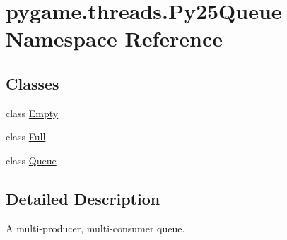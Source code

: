 \hypertarget{namespacepygame_1_1threads_1_1_py25_queue}{}\section{pygame.\+threads.\+Py25\+Queue Namespace Reference}
\label{namespacepygame_1_1threads_1_1_py25_queue}
\subsection*{Classes}
\begin{DoxyCompactItemize}
\item 
class \hyperlink{classpygame_1_1threads_1_1_py25_queue_1_1_empty}{Empty}
\item 
class \hyperlink{classpygame_1_1threads_1_1_py25_queue_1_1_full}{Full}
\item 
class \hyperlink{classpygame_1_1threads_1_1_py25_queue_1_1_queue}{Queue}
\end{DoxyCompactItemize}


\subsection{Detailed Description}
\begin{DoxyVerb}A multi-producer, multi-consumer queue.\end{DoxyVerb}
 